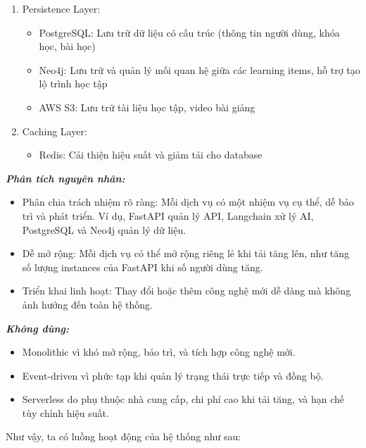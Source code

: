 \begin{enumerate}
    \begin{enumerate}
        \item Persistence Layer:
        \begin{itemize}
            \item PostgreSQL: Lưu trữ dữ liệu có cấu trúc (thông tin người dùng, khóa học, bài học)
            \item Neo4j: Lưu trữ và quản lý mối quan hệ giữa các learning items, hỗ trợ tạo lộ trình học tập
            \item AWS S3: Lưu trữ tài liệu học tập, video bài giảng
        \end{itemize}
        \item Caching Layer: 
        \begin{itemize}
            \item Redis: Cải thiện hiệu suất và giảm tải cho database
        \end{itemize}
    \end{enumerate}
\end{enumerate}
\textbf{\textit{Phân tích nguyên nhân:}}
\par \begin{itemize}
    \item Phân chia trách nhiệm rõ ràng: Mỗi dịch vụ có một nhiệm vụ cụ thể, dễ bảo trì và phát triển. Ví dụ, FastAPI quản lý API, Langchain xử lý AI, PostgreSQL và Neo4j quản lý dữ liệu.
    \item Dễ mở rộng: Mỗi dịch vụ có thể mở rộng riêng lẻ khi tải tăng lên, như tăng số lượng instances của FastAPI khi số người dùng tăng.
    \item Triển khai linh hoạt: Thay đổi hoặc thêm công nghệ mới dễ dàng mà không ảnh hưởng đến toàn hệ thống.
\end{itemize}
\textbf{\textit{Không dùng:}}
\begin{itemize}
    \item Monolithic vì khó mở rộng, bảo trì, và tích hợp công nghệ mới.
    \item Event-driven vì phức tạp khi quản lý trạng thái trực tiếp và đồng bộ.
    \item Serverless do phụ thuộc nhà cung cấp, chi phí cao khi tải tăng, và hạn chế tùy chỉnh hiệu suất.
\end{itemize}
Như vậy, ta có luồng hoạt động của hệ thống như sau:
